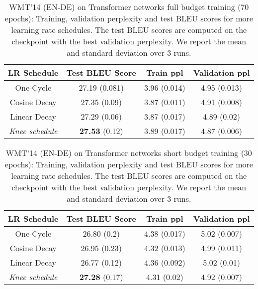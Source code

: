 \documentclass{article} \usepackage{iclr2021_conference,times}
\newcommand{\lrschedule}{\textit{Knee schedule}}
\begin{document}
\begin{table}[h]
\small
\centering
\caption{WMT'14 (EN-DE) on Transformer networks full budget training (70 epochs): Training, validation perplexity and test BLEU scores for more learning rate schedules. The test BLEU scores are computed on the checkpoint with the best validation perplexity. We report the mean and standard deviation over 3 runs.}
\label{tab:wmt_results_extra_baselines_full_budget}
\begin{tabular}{cccc}
  \toprule
  LR Schedule   & Test BLEU Score  & Train ppl & Validation ppl   \\ 
  \midrule 
  One-Cycle     &  27.19 (0.081)    & 3.96 (0.014)  & 4.95 (0.013)     \\
  Cosine Decay  &  27.35 (0.09)     & 3.87 (0.011)   & 4.91 (0.008)   \\
  Linear Decay  &  27.29 (0.06)     & 3.87 (0.017)   & 4.89 (0.02)   \\
  \lrschedule{} & \textbf{27.53} (0.12)      & 3.89 (0.017)   & 4.87 (0.006)    \\ 
  \bottomrule
\end{tabular}

\end{table}

\begin{table}[h]
\small
\centering
\caption{WMT'14 (EN-DE) on Transformer networks short budget training (30 epochs): Training, validation perplexity and test BLEU scores for more learning rate schedules. The test BLEU scores are computed on the checkpoint with the best validation perplexity. We report the mean and standard deviation over 3 runs.}
\label{tab:wmt_results_extra_baselines_short_budget}
\begin{tabular}{cccc}
  \toprule
  LR Schedule    & Test BLEU Score  & Train ppl & Validation ppl  \\ 
  \midrule
  One-Cycle      &  26.80 (0.2) & 4.38 (0.017)  & 5.02 (0.007)    \\
  Cosine Decay  &  26.95 (0.23) & 4.32 (0.013)  & 4.99 (0.011)   \\
  Linear Decay  & 26.77  (0.12) & 4.36 (0.092)  & 5.02 (0.01)  \\
  \lrschedule{} & \textbf{27.28} (0.17)  & 4.31 (0.02)   & 4.92 (0.007)    \\ 
  \bottomrule
\end{tabular}

\end{table}
\end{document}
